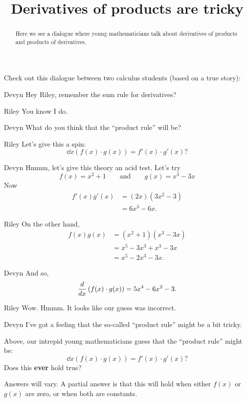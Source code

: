 \documentclass{ximera}
\title[Break-Ground:]{Derivatives of products are tricky}
\begin{document}
\begin{abstract}
Here we see a dialogue where young mathematicians talk about
derivatives of products and products of derivatives.
\end{abstract}
\maketitle

Check out this dialogue between two calculus students (based on a true
story):

\begin{dialogue}
\item[Devyn] Hey Riley, remember the sum rule for derivatives?
\item[Riley] You know I do.
\item[Devyn] What do you think that the ``product rule'' will be?
\item[Riley] Let's give this a spin:
  \[
  \dd{x} \left(f(x)\cdot g(x)\right) = f'(x) \cdot g'(x)?
  \]
\item[Devyn] Hmmm, let's give this theory an acid test. Let's try
  \[
  f(x) = x^2+1\qquad\text{and}\qquad g(x) = x^3-3x
  \]
  Now
  \begin{align*}
    f'(x)g'(x) &= (2x)(3x^2-3)\\
    &= 6x^3-6x.
  \end{align*}
\item[Riley] On the other hand,
  \begin{align*}
    f(x)g(x) &= (x^2+1)(x^3-3x)\\
    &=x^5-3x^3+x^3-3x\\
    &=x^5-2x^3-3x.
  \end{align*} 
\item[Devyn] And so, 
  \[
  \frac{d}{dx} \left(f(x) \cdot g(x)\right) = 5x^4-6x^2-3.
  \]
\item[Riley] Wow. Hmmm. It looks like our guess was incorrect.
\item[Devyn] I've got a feeling that the so-called ``product rule''
  might be a bit tricky.
\end{dialogue}

\begin{problem}
  Above, our intrepid young mathematicians guess that the ``product rule'' might be:
  \[
  \dd{x} \left(f(x)\cdot g(x)\right) = f'(x) \cdot g'(x)?
  \]
  Does this \textbf{ever} hold true?
  \begin{freeResponse}
    Answers will vary. A partial answer is that this will hold when
    either $f(x)$ or $g(x)$ are zero, or when both are constants.
  \end{freeResponse}
\end{problem}



\end{document}
